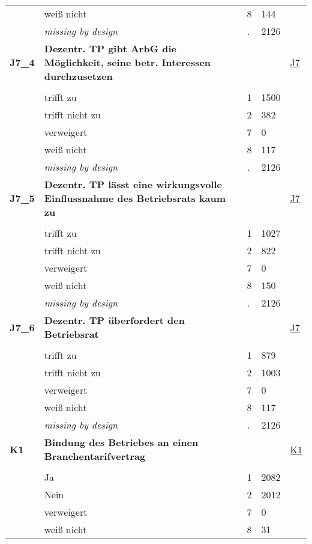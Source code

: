 \begin{longtable}{| L{2.65cm} | L{8cm} | C{1.5cm} | R{1.25cm} | C{2.25cm}  |}
   & weiß nicht & 8 & 144 &  \\ 
   & \textit{missing by design} & \textit{.} & 2126 &  \\ 
   \midrule
\textbf{J7\_4}\label{var:J7:4} & \textbf{Dezentr. TP gibt ArbG die Möglichkeit, seine betr. Interessen durchzusetzen} &  &  & \hyperref[J7]{J7} \\ 
   &  &  &  &  \\ 
   & trifft zu & 1 & 1500 &  \\ 
   & trifft nicht zu & 2 & 382 &  \\ 
   & verweigert & 7 & 0 &  \\ 
   & weiß nicht & 8 & 117 &  \\ 
   & \textit{missing by design} & \textit{.} & 2126 &  \\ 
   \midrule
\textbf{J7\_5}\label{var:J7:5} & \textbf{Dezentr. TP lässt eine wirkungsvolle Einflussnahme des Betriebsrats kaum zu} &  &  & \hyperref[J7]{J7} \\ 
   &  &  &  &  \\ 
   & trifft zu & 1 & 1027 &  \\ 
   & trifft nicht zu & 2 & 822 &  \\ 
   & verweigert & 7 & 0 &  \\ 
   & weiß nicht & 8 & 150 &  \\ 
   & \textit{missing by design} & \textit{.} & 2126 &  \\ 
   \midrule
\textbf{J7\_6}\label{var:J7:6} & \textbf{Dezentr. TP überfordert den Betriebsrat} &  &  & \hyperref[J7]{J7} \\ 
   &  &  &  &  \\ 
   & trifft zu & 1 & 879 &  \\ 
   & trifft nicht zu & 2 & 1003 &  \\ 
   & verweigert & 7 & 0 &  \\ 
   & weiß nicht & 8 & 117 &  \\ 
   & \textit{missing by design} & \textit{.} & 2126 &  \\ 
   \midrule
\textbf{K1}\label{var:K1} & \textbf{Bindung des Betriebes an einen Branchentarifvertrag} &  &  & \hyperref[K1]{K1} \\ 
   &  &  &  &  \\ 
   & Ja & 1 & 2082 &  \\ 
   & Nein & 2 & 2012 &  \\ 
   & verweigert & 7 & 0 &  \\ 
   & weiß nicht & 8 & 31 &  \\ 

\end{longtable}
